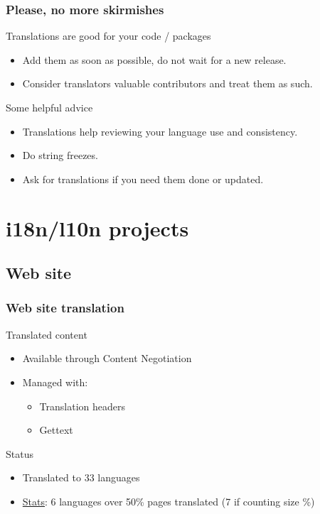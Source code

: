 \documentclass{beamer}
\begin{document}
\begin{frame}
  \frametitle{Please, no more skirmishes}
	\begin{block}
		{Translations are good for your code / packages}
		\begin{itemize}
		\item Add them as soon as possible, do not wait for a new release.
		\item Consider translators valuable contributors and treat them as such.
		\end{itemize}
	\end{block}
	\begin{block}
		{Some helpful advice}
		\begin{itemize}
		\item Translations help reviewing your language use and consistency.
		\item Do string freezes.
		\item Ask for translations if you need them done or updated.
		\end{itemize}
	\end{block}
\end{frame}


\section{i18n/l10n projects}

\subsection{Web site}

\begin{frame}
  \frametitle{Web site translation}
	\begin{block}
		{Translated content}
		\begin{itemize}
		\item Available through Content Negotiation
		\item Managed with:
		\begin{itemize}
		\item Translation headers
		\item Gettext
		\end{itemize}
		\end{itemize}
	\end{block}
	\begin{block}
		{Status}
		\begin{itemize}
		\item Translated to 33 languages
		\item \href{http://www.debian.org/devel/website/stats}{Stats}: 6 languages over 50\% pages translated (7 if counting size \%)
		\end{itemize}
	\end{block}
\end{frame}
\end{document}
